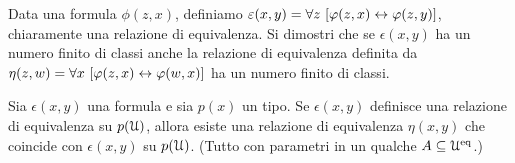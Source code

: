 
\begin{exercise}\label{exojkdnoi}
Data una formula $\phi(z,x)$, definiamo $\epsilon(x,y)=\A z\ [\phi(z,x)\iff\phi(z,y)]$, chiaramente una relazione di equivalenza. Si dimostri che se $\epsilon(x,y)$ ha un numero finito di classi anche la relazione di equivalenza definita da $\eta(z,w)=\A x\ [\phi(z,x)\iff\phi(w,x)]$ ha un numero finito di classi.\QED
\end{exercise}

\begin{exercise} 
Sia $\epsilon(x,y)$ una formula e sia $p(x)$ un tipo. Se $\epsilon(x,y)$ definisce una relazione di equivalenza su $p(\EuScript U)$, allora esiste una relazione di equivalenza $\eta(x,y)$ che coincide con $\epsilon(x,y)$ su $p(\EuScript U)$. (Tutto con parametri in un qualche $A\subseteq\EuScript U^{\rm eq}$.)\QED
\end{exercise}

